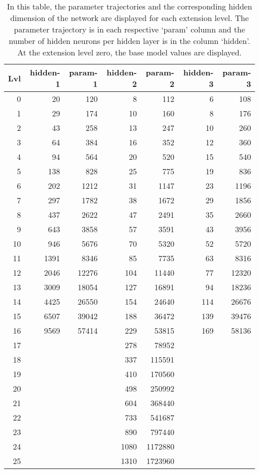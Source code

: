 \begin{table}\scriptsize
    {
    \sffamily
    \caption[Parameter Trajectories of different network sizes]{
    In this table, the parameter trajectories and the corresponding hidden dimension of the network are displayed for each extension level. 
    The parameter trajectory is in each respective `param' column and the number of hidden neurons per hidden layer is in the column `hidden'.
    At the extension level zero, the base model values are displayed.
    }\label{tab:trajectory}
    \begin{tabular}{rrrrrrr}
    \toprule
    Lvl & hidden-1 & param-1 & hidden-2 & param-2 & hidden-3 & param-3 \\
    \midrule
    0 & 20 & 120 & 8 & 112 & 6 & 108 \\
    1 & 29 & 174 & 10 & 160 & 8 & 176 \\
    2 & 43 & 258 & 13 & 247 & 10 & 260 \\
    3 & 64 & 384 & 16 & 352 & 12 & 360 \\
    4 & 94 & 564 & 20 & 520 & 15 & 540 \\
    5 & 138 & 828 & 25 & 775 & 19 & 836 \\
    6 & 202 & 1212 & 31 & 1147 & 23 & 1196 \\
    7 & 297 & 1782 & 38 & 1672 & 29 & 1856 \\
    8 & 437 & 2622 & 47 & 2491 & 35 & 2660 \\
    9 & 643 & 3858 & 57 & 3591 & 43 & 3956 \\
    10 & 946 & 5676 & 70 & 5320 & 52 & 5720 \\
    11 & 1391 & 8346 & 85 & 7735 & 63 & 8316 \\
    12 & 2046 & 12276 & 104 & 11440 & 77 & 12320 \\
    13 & 3009 & 18054 & 127 & 16891 & 94 & 18236 \\
    14 & 4425 & 26550 & 154 & 24640 & 114 & 26676 \\
    15 & 6507 & 39042 & 188 & 36472 & 139 & 39476 \\
    16 & 9569 & 57414 & 229 & 53815 & 169 & 58136 \\
    17 &   &   & 278 & 78952 &   &   \\
    18 &   &   & 337 & 115591 &   &   \\
    19 &   &   & 410 & 170560 &   &   \\
    20 &   &   & 498 & 250992 &   &   \\
    21 &   &   & 604 & 368440 &   &   \\
    22 &   &   & 733 & 541687 &   &   \\
    23 &   &   & 890 & 797440 &   &   \\
    24 &   &   & 1080 & 1172880 &   &   \\
    25 &   &   & 1310 & 1723960 &   &   \\
    \bottomrule
    \end{tabular}
    }
\end{table}

